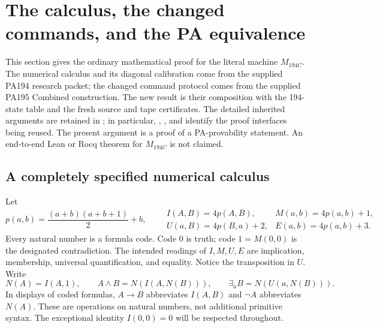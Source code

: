 \section{The calculus, the changed commands, and the PA equivalence}
\label{cal:section}

This section gives the ordinary mathematical proof for the literal
machine $M_{194C}$.  The numerical calculus and its diagonal calibration
come from the supplied PA194 research packet; the changed command protocol
comes from the supplied PA195 Combined construction.  The new result is
their composition with the 194-state table and the fresh source and tape
certificates.  The detailed inherited arguments are retained in
; in particular,
,
, and  identify the
proof interfaces being reused.  The present argument is a proof of a
PA-provability statement.  An end-to-end Lean or Rocq theorem for
$M_{194C}$ is not claimed.

\subsection{A completely specified numerical calculus}
\label{cal:calculus}

Let
\[
 p(a,b)=\frac{(a+b)(a+b+1)}2+b,
 \qquad
 \begin{array}{ll}
 I(A,B)=4p(A,B),&M(a,b)=4p(a,b)+1,\\
 U(a,B)=4p(B,a)+2,&E(a,b)=4p(a,b)+3.
 \end{array}
\]
Every natural number is a formula code.  Code $0$ is truth; code
$1=M(0,0)$ is the designated contradiction.  The intended readings of
$I,M,U,E$ are implication, membership, universal quantification, and
equality.  Notice the transposition in $U$.  Write
\[
 N(A)=I(A,1),\qquad
 A\wedge B=N(I(A,N(B))),\qquad
 \exists_a B=N(U(a,N(B))).
\]
In displays of coded formulas, $A\to B$ abbreviates $I(A,B)$ and
$\neg A$ abbreviates $N(A)$.  These are operations on natural numbers,
not additional primitive syntax.  The exceptional identity
$I(0,0)=0$ will be respected throughout.

